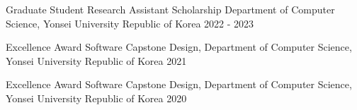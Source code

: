 


\begin{cvhonors}

  \cvhonor
    {Graduate Student Research Assistant Scholarship} %
    {Department of Computer Science, Yonsei University} %
    {Republic of Korea} %
    {2022 - 2023} %

  \cvhonor
    {Excellence Award} %
    {Software Capstone Design, Department of Computer Science, Yonsei University} %
    {Republic of Korea} %
    {2021} %

  \cvhonor
    {Excellence Award} %
    {Software Capstone Design, Department of Computer Science, Yonsei University} %
    {Republic of Korea} %
    {2020} %

\end{cvhonors}
